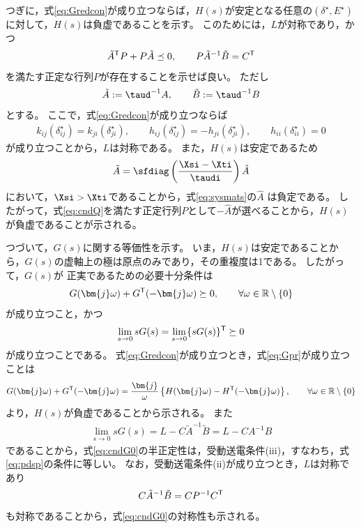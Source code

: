 \documentclass[tombow,dvipdfmx]{corona-a5-1.1}
\begin{document}
\begin{証明}
つぎに，式\ref{eq:Gredcon}が成り立つならば，$H(s)$が安定となる任意の$(\delta^{\star},E^{\star})$に対して，$H(s)$は負虚であることを示す。
このためには，$L$が対称であり，かつ
\begin{align}\label{eq:cndQ}
\tilde{A}^{\sf T}P + P\tilde{A} \preceq 0
,\qquad
P\tilde{A}^{-1}\tilde{B}=C^{\sf T}
\end{align}
を満たす正定な行列$P$が存在することを示せば良い。
ただし
\begin{align*}
\tilde{A}:= \taud^{-1}A
,\qquad
\tilde{B}:= \taud^{-1}B
\end{align*}
とする。
ここで，式\ref{eq:Gredcon}が成り立つならば
\begin{align*}
k_{ij}(\delta_{ij}^{\star}) =
k_{ji}(\delta_{ji}^{\star})
,\qquad
h_{ij}(\delta_{ij}^{\star}) = 
- h_{ji}(\delta_{ji}^{\star}),\qquad
h_{ii}(\delta_{ii}^{\star}) = 0
\end{align*}
が成り立つことから，$L$は対称である。
また，$H(s)$は安定であるため
\begin{align*}
\tilde{A} = 
\sfdiag \left( \frac{ \Xsi -  \Xti }{ \taudi } \right)
\hat{A}
\end{align*}
において，$\Xsi > \Xti$であることから，式\ref{eq:sysmats}の$\hat{A}$
は負定である。
したがって，式\ref{eq:cndQ}を満たす正定行列$P$として$-\hat{A}$が選べることから，$H(s)$が負虚であることが示される。


つづいて，$G(s)$に関する等価性を示す。
いま，$H(s)$は安定であることから，$G(s)$の虚軸上の極は原点のみであり，その重複度は1である。
したがって，$G(s)$が
正実であるための必要十分条件は
\begin{align}\label{eq:Gpr}
G(\bm{j}\omega) + G^{\sf T}(-\bm{j}\omega) \succeq 0
,\qquad \forall \omega \in \mathbb{R}\setminus\{0\}
\end{align}
が成り立つこと，かつ
\begin{align}\label{eq:cndG0}
\lim_{s\rightarrow 0} s G(s) = \lim_{s\rightarrow 0} \{ s G(s)\}^{\sf T}\succeq 0
\end{align}
が成り立つことである。
式\ref{eq:Gredcon}が成り立つとき，式\ref{eq:Gpr}が成り立つことは
\begin{align}\label{eq:NIineq}
G(\bm{j}\omega) + G^{\sf T}(-\bm{j}\omega)
=
\frac{\bm{j}}{\omega} \left\{
H(\bm{j}\omega) - H^{\sf T}(-\bm{j}\omega)
\right\}
,\qquad \forall \omega \in \mathbb{R}\setminus\{0\}
\end{align}
より，$H(s)$が負虚であることから示される。
また
\begin{align*}
\lim_{s\rightarrow 0} s G(s) =
L - C\tilde{A}^{-1}\tilde{B} = L - C A^{-1} B
\end{align*}
であることから，式\ref{eq:cndG0}の半正定性は，受動送電条件(iii)，すなわち，式\ref{eq:pdsp}の条件に等しい。
なお，受動送電条件(ii)が成り立つとき，$L$は対称であり
\begin{align*}
C\tilde{A}^{-1}\tilde{B} = C P^{-1} C^{\sf T}
\end{align*}
も対称であることから，式\ref{eq:cndG0}の対称性も示される。


\end{証明}
\end{document}
